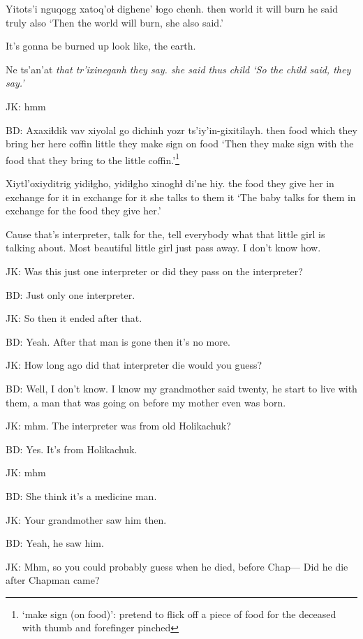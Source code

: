 \documentclass[12pt]{article}
\begin{document}
\gll Yitots'i {nguqogg} xatoq'oɬ   dighene' ɬogo   chenh. 
then     world      {it will burn} {he said} truly also
\glt `Then the world will burn, she also said.'
\glend

It's gonna be burned up look like, the earth.

\gll Ne ts'an'at \em that tr'ixineganh {\em they say.}
{she said} thus {}     child
\glt `So the child said, they say.'
\glend

JK:  hmm

BD: 
\gll Axaxiɬdik vav  xiyolal             go   dichinh yozr   {ts'iy'in-gixitilayh.}
then    food {which they bring her} here coffin  little {they make sign on food}
\glt `Then they make sign with the food that they bring to the little coffin.'\footnote{`make sign (on food)': pretend to flick off a piece of food for the deceased with thumb and forefinger pinched}
\glend

\gll Xiytl'oxiyditrig       yidiɬgho,         yidiɬgho {xinoghɬ di'ne}     hiy.
{the food they give her} {in exchange for it} {in exchange for it}  {she talks to them} it
\glt `The baby talks for them in exchange for the food they give her.'
\glend

Cause that's interpreter, talk for the, tell everybody what that
little girl is talking about.  Most beautiful little girl just pass
away.  I don't know how.

JK:  Was this just one interpreter or did they pass on the interpreter?

BD:  Just only one interpreter.

JK:  So then it ended after that.

BD:  Yeah. After that man is gone then it's no more.

JK:  How long ago did that interpreter die would you guess?

BD: Well, I don't know.  I know my grandmother said twenty, he start to live
with them, a man that was going on before my mother even was born.

JK:  mhm. The interpreter was from old Holikachuk?

BD:  Yes. It's from Holikachuk. 

JK:  mhm

BD:  She think it's a medicine man.

JK:  Your grandmother saw him then.

BD:  Yeah, he saw him.

JK: Mhm, so you could probably guess when he died, before Chap--- Did he
die after Chapman came?
\end{document}
